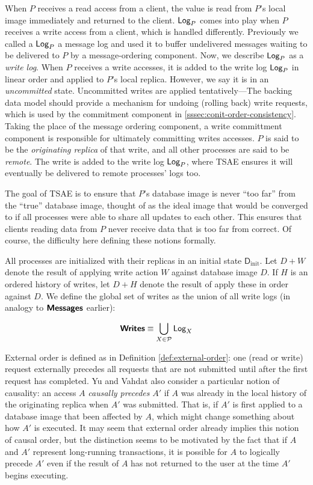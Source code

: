 \documentclass[]             %
{NASA}                       %
\theoremstyle{definition}
\begin{document}
When $P$ receives a read access from a client, the value is read from
$P$'s local image immediately and returned to the client. $\textsf{Log}_{P}$
comes into play when $P$ receives a write access from a client, which
is handled differently. Previously we called a $\textsf{Log}_{P}$ a message log
and used it to buffer undelivered messages waiting to be delivered to
$P$ by a message-ordering component. Now, we describe $\textsf{Log}_{P}$ as a
\emph{write log}. When $P$ receives a write accesses, it is added to
the write log $\textsf{Log}_{P}$ in linear order and applied to $P$'s local
replica. However, we say it is in an \emph{uncommitted}
state. Uncommitted writes are applied tentatively---The backing data
model should provide a mechanism for undoing (rolling back) write
requests, which is used by the commitment component in
\ref{sssec:conit-order-consistency}. Taking the place of the message
ordering component, a write committment component is responsible for
ultimately committing writes accesses.  $P$ is said to be the
\emph{originating replica} of that write, and all other processes are
said to be \emph{remote}. The write is added to the write log
$\textsf{Log}_{P}$, where TSAE ensures it will eventually be delivered to remote
processes' logs too.

The goal of TSAE is to ensure that $P$'s database image is never ``too
far'' from the ``true'' database image, thought of as the ideal image
that would be converged to if all processes were able to share all
updates to each other. This ensures that clients reading data from $P$
never receive data that is too far from correct. Of course, the
difficulty here defining these notions formally.

All processes are initialized with their replicas in an initial state
$\mathsf{D}_{\textrm{init}}$. Let $D + W$ denote the result of
applying write action $W$ against database image $D$. If $H$ is an
ordered history of writes, let $D + H$ denote the result of apply
these in order against $D$. We define the global set of writes as the
union of all write logs (in analogy to $\textbf{\textsf{Messages}}$ earlier):

\[ \textbf{\textsf{Writes}} \equiv \bigcup_{X \in \mathcal{P}} \textsf{Log}_{X}\]

External order is defined as in Definition \ref{def:external-order}:
one (read or write) request externally precedes all requests that are
not submitted until after the first request has completed. Yu and
Vahdat also consider a particular notion of causality: an access $A$
\emph{causally precedes} $A'$ if $A$ was already in the local history
of the originating replica when $A'$ was submitted. That is, if $A'$
is first applied to a database image that been affected by $A$, which
might change something about how $A'$ is executed. It may seem that
external order already implies this notion of causal order, but the
distinction seems to be motivated by the fact that if $A$ and $A'$
represent long-running transactions, it is possible for $A$ to
logically precede $A'$ even if the result of $A$ has not returned to
the user at the time $A'$ begins executing.
\end{document}
